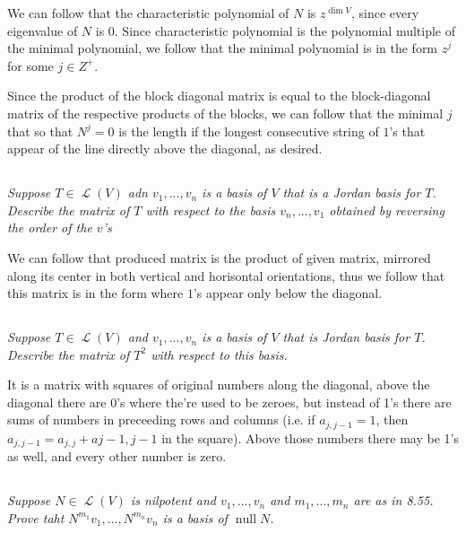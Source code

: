 \documentclass[11pt,oneside,titlepage]{book}
\DeclareMathOperator \map {\mathcal {L}}
\DeclareMathOperator \ns {null}
\begin{document}
We can follow that the characteristic polynomial of $N$ is $z^{\dim V}$, since every eigenvalue of
$N$ is 0. Since characteristic polynomial is the polynomial multiple of the minimal polynomial,
we follow that the minimal polynomial is in the form $z^j$ for some $j \in Z^+$.

Since the product of the block diagonal matrix is equal to the block-diagonal matrix
of the respective products of the blocks, we can follow that the minimal $j$ that
so that $N^j = 0$ is the length if the longest consecutive string of $1$'s that appear of the line
directly above the diagonal, as desired.

\subsection{}

\textit{Suppose $T \in \map(V)$ adn $v_1, ..., v_n$ is a basis of $V$ that is a Jordan basis
  for $T$. Describe the matrix of $T$ with respect to the basis $v_n, ..., v_1$ obtained
  by reversing the order of the $v$'s}

We can follow that produced matrix is the product of given matrix, mirrored along its center
in both vertical and horisontal orientations, thus we follow that this matrix is in the
form where $1$'s appear only below the diagonal.

\subsection{}

\textit{Suppose $T \in \map(V)$ and $v_1, ..., v_n$ is a basis of $V$ that is Jordan basis
  for $T$. Describe the matrix of $T^2$ with respect to this basis.}

It is a matrix with squares of original numbers along the diagonal, above the diagonal
there are 0's where the're used to be zeroes, but instead of 1's there are sums of numbers
in preceeding rows and columns (i.e. if $a_{j, j - 1} = 1$,
then $a_{j, j - 1} = a_{j, j} + a{j - 1, j - 1}$ in the square). Above those numbers there may be 1's
as well, and every other number is zero.

\subsection{}

\textit{Suppose $N \in \map(V)$ is nilpotent and $v_1, ..., v_n$  and $m_1, ..., m_n$ are
  as in 8.55. Prove taht $N^{m_1}v_1, ..., N^{m_n}v_n$ is a basis of $\ns N$.}
\end{document}
